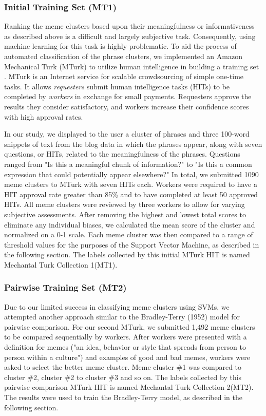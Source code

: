 \documentclass{sig-alternate}
\begin{document}
\subsubsection{Initial Training Set (MT1)}
Ranking the meme clusters based upon their meaningfulness or informativeness as described above is a difficult and largely subjective task. Consequently, using machine learning for this task is highly problematic. To aid the process of automated classification of the phrase clusters, we implemented an Amazon Mechanical Turk (MTurk) to utilize human intelligence in building a training set \cite{Barr2006}. MTurk is an Internet service for scalable crowdsourcing of simple one-time tasks. It allows \emph{requesters} submit human intelligence tasks (HITs) to be completed by \emph{workers} in exchange for small payments. Requesters approve the results they consider satisfactory, and workers increase their confidence scores with high approval rates.

In our study, we displayed to the user a cluster of phrases and three 100-word snippets of text from the blog data in which the phrases appear, along with seven questions, or HITs, related to the meaningfulness of the phrases. Questions ranged from "Is this a meaningful chunk of information?" to "Is this a common expression that could potentially appear elsewhere?"  In total, we submitted 1090 meme clusters to MTurk with seven HITs each. Workers were required to have a HIT approval rate greater than 85\% and to have completed at least 50 approved HITs.
  All meme clusters were reviewed by three workers to allow for varying subjective assessments.  After removing the highest and lowest total scores to eliminate any individual biases, we calculated the mean score of the cluster and normalized on a 0-1 scale. Each meme cluster was then compared to a range of threshold values for the purposes of the Support Vector Machine, as described in the following section. The labels collected by this initial MTurk HIT is named Mechantal Turk Collection 1(MT1).

\subsubsection{Pairwise Training Set (MT2)}
Due to our limited success in classifying meme clusters using SVMs, we attempted another approach similar to the Bradley-Terry (1952) model for pairwise comparison.  For our second MTurk, we submitted 1,492 meme clusters to be compared sequentially by workers. After workers were presented with a definition for memes ("an idea, behavior or style that spreads from person to person within a culture") and examples of good and bad memes, workers were asked to select the better meme cluster. Meme cluster \#1 was compared to cluster \#2, cluster \#2 to cluster \#3 and so on. The labels collected by this pairwise comparison MTurk HIT is named Mechantal Turk Collection 2(MT2). The results were used to train the Bradley-Terry model, as described in the following section. 
\end{document}
